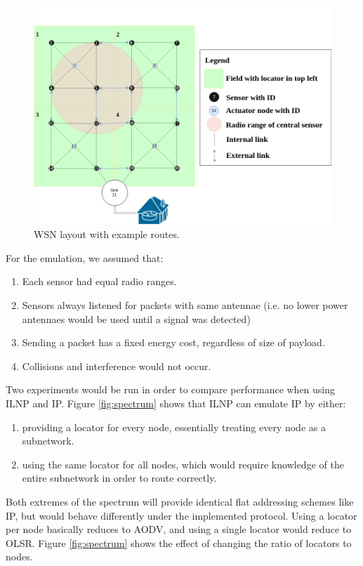 \documentclass[12pt]{article}
\begin{document}
\begin{figure}[!ht]
	\centering
	\includegraphics[width=\linewidth]{images/layout}
	\caption{WSN layout with example routes.}
	\label{fig:layout}
\end{figure}

For the emulation, we assumed that: 
\begin{enumerate}
    \item Each sensor had equal radio ranges.
    \item Sensors always listened for packets with same antennae (i.e. no lower power antennaes would be used until a signal was detected\cite{offon})
    \item Sending a packet has a fixed energy cost, regardless of size of payload.
    \item Collisions and interference would not occur.
\end{enumerate}

Two experiments would be run in order to compare performance when using ILNP and IP. Figure \ref{fig:spectrum} shows that ILNP can emulate IP by either:
\begin{enumerate}
	\item providing a locator for every node, essentially treating every node as a subnetwork.
	\item using the same locator for all nodes, which would require knowledge of the entire subnetwork in order to route correctly.
\end{enumerate}

Both extremes of the spectrum will provide identical flat addressing schemes like IP, but would behave differently under the implemented protocol. Using a locator per node basically reduces to AODV, and using a single locator would reduce to OLSR. Figure \ref{fig:spectrum} shows the effect of changing the ratio of locators to nodes.
\end{document}
